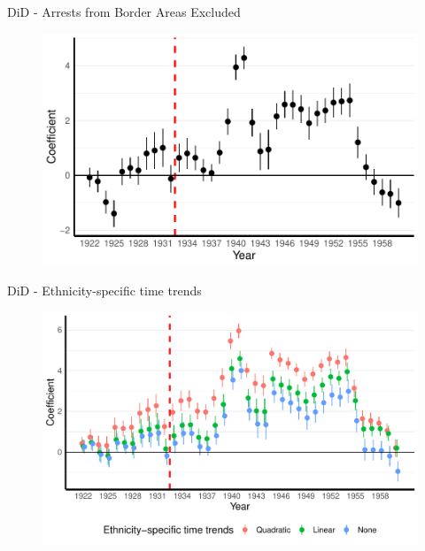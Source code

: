 \documentclass[11pt]{beamer}
\begin{document}
\begin{frame}[label=did_non_border_area]{DiD - Arrests from Border Areas Excluded}
 \begin{figure}[h]
\centering
\includegraphics[width=1\textwidth]{point_range_robust_cr2_non_border_provinces.pdf}
\end{figure}
\hyperlink{robustness_checks}{}
\end{frame}

\begin{frame}[label=did_time_trends]{DiD - Ethnicity-specific time trends}
 \begin{figure}[h]
\centering
\includegraphics[width=1\textwidth]{trends_comp_pred_full_imp_date_cr2.pdf}
\end{figure}
\hyperlink{robustness_checks}{}
\end{frame}
\end{document}
